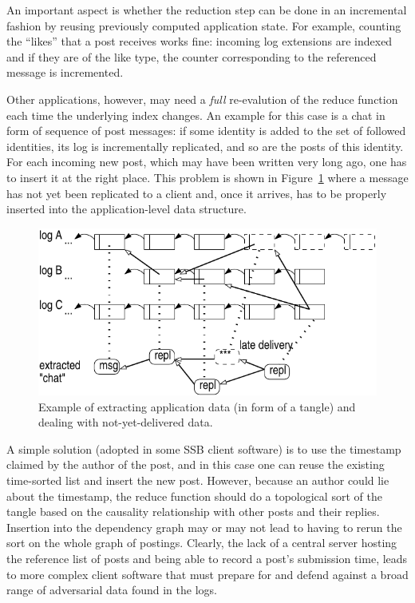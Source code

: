 \documentclass[9pt,sigconf]{acmart}
\begin{document}
An important aspect is whether the reduction step can be done in an
incremental fashion by reusing previously computed application state.
For example, counting the ``likes'' that a post receives works fine:
incoming log extensions are indexed and if they are of the like type,
the counter corresponding to the referenced message is incremented.

Other applications, however, may need a {\em full} re-evalution of the
reduce function each time the underlying index changes. An example for
this case is a chat in form of sequence of post messages: if some identity is added to
the set of followed identities, its log is incrementally replicated, and
so are the posts of this identity. For each incoming new post, which may
have been written very long ago, one has to insert it at the right
place. This problem is shown in Figure~\ref{fig:tangle} where a message
has not yet been replicated to a client and, once it arrives,
has to be properly inserted into the application-level data structure.

\begin{figure}[htb]
  \includegraphics[width=0.9\columnwidth]{figs/tangle.pdf}
  \caption{Example of extracting application data (in form of
    a tangle) and dealing
    with not-yet-delivered data.\label{fig:tangle}}
\end{figure}

A simple solution (adopted in some SSB client software) is to use the
timestamp claimed by the author of the post, and in this case one can
reuse the existing time-sorted list and insert the new post. However,
because an author could lie about the timestamp, the reduce function
should do a topological sort of the tangle based on the causality relationship with
other posts and their replies. Insertion into the dependency graph may
or may not lead to having to rerun the sort on the whole graph of
postings. Clearly, the lack of a central server hosting the reference
list of posts and being able to record a post's submission time, leads
to more complex client software that must prepare for and defend
against a broad range of adversarial data found in the logs.
\end{document}
